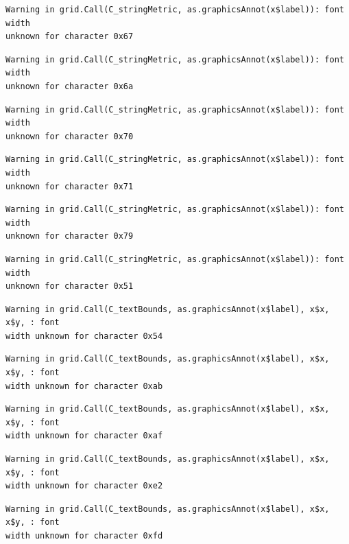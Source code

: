 \documentclass[
  letterpaper,
  DIV=11,
  numbers=noendperiod]{scrreprt}
\begin{document}
\begin{verbatim}
Warning in grid.Call(C_stringMetric, as.graphicsAnnot(x$label)): font width
unknown for character 0x67
\end{verbatim}

\begin{verbatim}
Warning in grid.Call(C_stringMetric, as.graphicsAnnot(x$label)): font width
unknown for character 0x6a
\end{verbatim}

\begin{verbatim}
Warning in grid.Call(C_stringMetric, as.graphicsAnnot(x$label)): font width
unknown for character 0x70
\end{verbatim}

\begin{verbatim}
Warning in grid.Call(C_stringMetric, as.graphicsAnnot(x$label)): font width
unknown for character 0x71
\end{verbatim}

\begin{verbatim}
Warning in grid.Call(C_stringMetric, as.graphicsAnnot(x$label)): font width
unknown for character 0x79
\end{verbatim}

\begin{verbatim}
Warning in grid.Call(C_stringMetric, as.graphicsAnnot(x$label)): font width
unknown for character 0x51
\end{verbatim}

\begin{verbatim}
Warning in grid.Call(C_textBounds, as.graphicsAnnot(x$label), x$x, x$y, : font
width unknown for character 0x54
\end{verbatim}

\begin{verbatim}
Warning in grid.Call(C_textBounds, as.graphicsAnnot(x$label), x$x, x$y, : font
width unknown for character 0xab
\end{verbatim}

\begin{verbatim}
Warning in grid.Call(C_textBounds, as.graphicsAnnot(x$label), x$x, x$y, : font
width unknown for character 0xaf
\end{verbatim}

\begin{verbatim}
Warning in grid.Call(C_textBounds, as.graphicsAnnot(x$label), x$x, x$y, : font
width unknown for character 0xe2
\end{verbatim}

\begin{verbatim}
Warning in grid.Call(C_textBounds, as.graphicsAnnot(x$label), x$x, x$y, : font
width unknown for character 0xfd
\end{verbatim}
\end{document}
